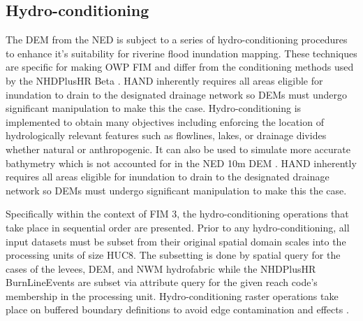 \subsection{Hydro-conditioning}
\label{ssec:hydro_conditioning}
%
The DEM from the NED is subject to a series of hydro-conditioning procedures to enhance it's suitability for riverine flood inundation mapping. 
These techniques are specific for making OWP FIM and differ from the conditioning methods used by the NHDPlusHR Beta \cite{moore2019user}.
HAND inherently requires all areas eligible for inundation to drain to the designated drainage network so DEMs must undergo significant manipulation to make this the case.
Hydro-conditioning is implemented to obtain many objectives including enforcing the location of hydrologically relevant features such as flowlines, lakes, or drainage divides whether natural or anthropogenic. 
It can also be used to simulate more accurate bathymetry which is not accounted for in the NED 10m DEM \cite{gesch2002national}.
HAND inherently requires all areas eligible for inundation to drain to the designated drainage network so DEMs must undergo significant manipulation to make this the case.

Specifically within the context of FIM 3, the hydro-conditioning operations that take place in sequential order are presented. 
Prior to any hydro-conditioning, all input datasets must be subset from their original spatial domain scales into the processing units of size HUC8. 
The subsetting is done by spatial query for the cases of the levees, DEM, and NWM hydrofabric while the NHDPlusHR BurnLineEvents are subset via attribute query for the given reach code's membership in the processing unit.
Hydro-conditioning raster operations take place on buffered boundary definitions to avoid edge contamination and effects \cite{lindsay2013measuring}. 
%
